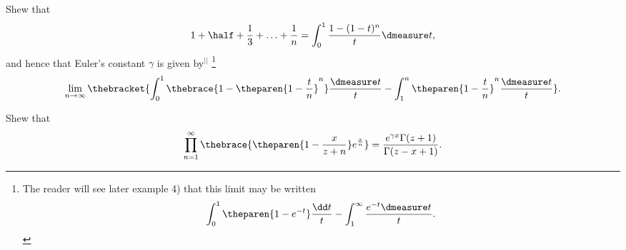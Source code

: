 \begin{wandwexample}
  Shew that
  \begin{displaymath}
    1 + \half + \frac{1}{3} + \ldots + \frac{1}{n} =
    \int_0^1 \frac{1 - (1 - t)^n}{t} \dmeasure t ,
  \end{displaymath}
  and hence that Euler's constant $\gamma$ is given by$^{||}$ \footnote{The
    reader will see later  example 4) that this
    limit may be written 
    \begin{displaymath}
      \int_0^1 \theparen{1 - e^{-t}} \frac{\dd t}{t} - 
      \int_1^\infty \frac{e^{-t} \dmeasure t}{t} .
    \end{displaymath}
  } %
  \begin{displaymath}
  \lim_{n \rightarrow \infty} \thebracket{\int_0^1 \thebrace{1 -
      \theparen{1-\frac{t}{n}}^n}  \frac{\dmeasure t}{t} - 
      \int_1^n \theparen{1-\frac{t}{n}}^n  \frac{\dmeasure t}{t}} .
  \end{displaymath}
\end{wandwexample}

\begin{wandwexample}
  Shew that
  \begin{displaymath}
    \prod_{n=1}^\infty \thebrace{\theparen{1 - \frac{x}{z + n}}
      e^{\frac{x}{n}}} = \frac{e^{\gamma x}\Gamma(z + 1)}{\Gamma(z - x + 1)} .
  \end{displaymath}
\end{wandwexample}

%
%



